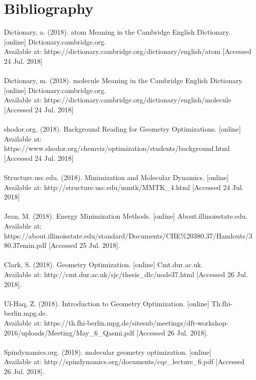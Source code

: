 \documentclass[9pt]{article}
\begin{document}
\section{Bibliography}

Dictionary, a. (2018). atom Meaning in the Cambridge English Dictionary. [online] Dictionary.cambridge.org. 
\\Available at: https://dictionary.cambridge.org/dictionary/english/atom [Accessed 24 Jul. 2018]
\\
\\
Dictionary, m. (2018). molecule Meaning in the Cambridge English Dictionary. [online] Dictionary.cambridge.org.
\\Available at: https://dictionary.cambridge.org/dictionary/english/molecule [Accessed 24 Jul. 2018]
\\
\\
shodor.org. (2018). Background Reading for Geometry Optimizations. [online] 
\\Available at: https://www.shodor.org/chemviz/optimization/students/background.html [Accessed 24 Jul. 2018]
\\
\\
Structure.usc.edu. (2018). Minimization and Molecular Dynamics. [online] 
\\Available at: http://structure.usc.edu/mmtk/MMTK\_4.html [Accessed 24 Jul. 2018]
\\
\\
Jean, M. (2018). Energy Minimization Methods. [online]  About.illinoisstate.edu.
\\Available at: https://about.illinoisstate.edu/standard/Documents/CHE\%20380.37/Handouts/380.37emin.pdf [Accessed 25 Jul. 2018].
\\
\\
Clark, S. (2018). Geometry Optimization. [online] Cmt.dur.ac.uk. 
\\Available at: http://cmt.dur.ac.uk/sjc/thesis\_dlc/node37.html [Accessed 26 Jul. 2018].
\\
\\
Ul-Haq, Z. (2018). Introduction to Geometry Optimization. [online] Th.fhi-berlin.mpg.de. 
\\Available at: https://th.fhi-berlin.mpg.de/sitesub/meetings/dft-workshop-2016/uploads/Meeting/May\_6\_Qasmi.pdf [Accessed 26 Jul. 2018].
\\
\\
Spindynamics.org. (2018). molecular geometry optimization. [online]
\\Available at: http://spindynamics.org/documents/cqc\_lecture\_6.pdf [Accessed 26 Jul. 2018].
\end{document}
